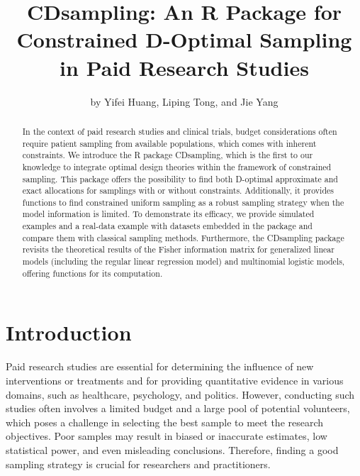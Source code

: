 \title{CDsampling: An R Package for Constrained D-Optimal Sampling in Paid Research Studies}
\author{by Yifei Huang, Liping Tong, and Jie Yang}

\maketitle

\begin{abstract}
In the context of paid research studies and clinical trials, budget considerations often require patient sampling from available populations, which comes with inherent constraints. We introduce the R package CDsampling, which is the first to our knowledge to integrate optimal design theories within the framework of constrained sampling. This package offers the possibility to find both D-optimal approximate and exact allocations for samplings with or without constraints. Additionally, it provides functions to find constrained uniform sampling as a robust sampling strategy when the model information is limited. To demonstrate its efficacy, we provide simulated examples and a real-data example with datasets embedded in the package and compare them with classical sampling methods. Furthermore, the CDsampling package revisits the theoretical results of the Fisher information matrix for generalized linear models (including the regular linear regression model) and multinomial logistic models, offering functions for its computation.
\end{abstract}

\section{Introduction}\label{sec:intro}

Paid research studies are essential for determining the influence of new interventions or treatments and for providing quantitative evidence in various domains, such as healthcare, psychology, and politics. However, conducting such studies often involves a limited budget and a large pool of potential volunteers, which poses a challenge in selecting the best sample to meet the research objectives. Poor samples may result in biased or inaccurate estimates, low statistical power, and even misleading conclusions. Therefore, finding a good sampling strategy is crucial for researchers and practitioners.

